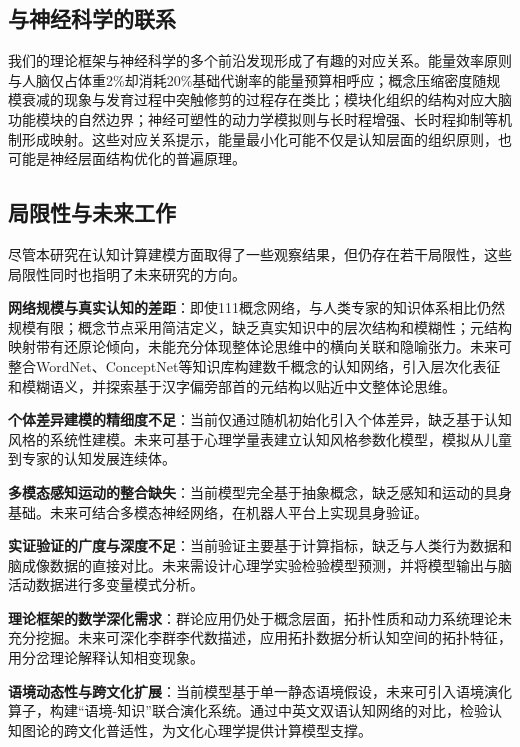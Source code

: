 \documentclass[12pt,a4paper]{article}
\begin{document}
\subsection{与神经科学的联系}

我们的理论框架与神经科学的多个前沿发现形成了有趣的对应关系。能量效率原则与人脑仅占体重2\%却消耗20\%基础代谢率的能量预算相呼应；概念压缩密度随规模衰减的现象与发育过程中突触修剪的过程存在类比；模块化组织的结构对应大脑功能模块的自然边界；神经可塑性的动力学模拟则与长时程增强、长时程抑制等机制形成映射。这些对应关系提示，能量最小化可能不仅是认知层面的组织原则，也可能是神经层面结构优化的普遍原理。

\subsection{局限性与未来工作}

尽管本研究在认知计算建模方面取得了一些观察结果，但仍存在若干局限性，这些局限性同时也指明了未来研究的方向。

\textbf{网络规模与真实认知的差距}：即使111概念网络，与人类专家的知识体系相比仍然规模有限；概念节点采用简洁定义，缺乏真实知识中的层次结构和模糊性；元结构映射带有还原论倾向，未能充分体现整体论思维中的横向关联和隐喻张力。未来可整合WordNet、ConceptNet等知识库构建数千概念的认知网络，引入层次化表征和模糊语义，并探索基于汉字偏旁部首的元结构以贴近中文整体论思维。

\textbf{个体差异建模的精细度不足}：当前仅通过随机初始化引入个体差异，缺乏基于认知风格的系统性建模。未来可基于心理学量表建立认知风格参数化模型，模拟从儿童到专家的认知发展连续体。

\textbf{多模态感知运动的整合缺失}：当前模型完全基于抽象概念，缺乏感知和运动的具身基础。未来可结合多模态神经网络，在机器人平台上实现具身验证。

\textbf{实证验证的广度与深度不足}：当前验证主要基于计算指标，缺乏与人类行为数据和脑成像数据的直接对比。未来需设计心理学实验检验模型预测，并将模型输出与脑活动数据进行多变量模式分析。

\textbf{理论框架的数学深化需求}：群论应用仍处于概念层面，拓扑性质和动力系统理论未充分挖掘。未来可深化李群李代数描述，应用拓扑数据分析认知空间的拓扑特征，用分岔理论解释认知相变现象。

\textbf{语境动态性与跨文化扩展}：当前模型基于单一静态语境假设，未来可引入语境演化算子，构建“语境-知识”联合演化系统。通过中英文双语认知网络的对比，检验认知图论的跨文化普适性，为文化心理学提供计算模型支撑。

\end{document}
